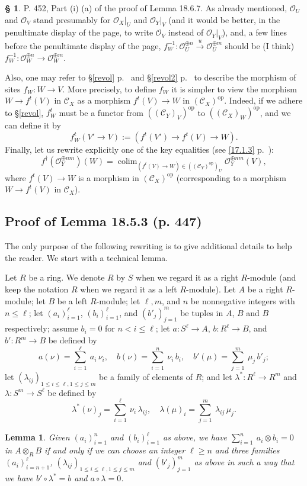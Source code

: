 \documentclass[12pt]{article}
\newtheorem{lem}[thm]{Lemma}
\theoremstyle{remark}
\theoremstyle{definition}
\newtheorem{s}[thm]{\S}
\newcommand{\cc}{\mathcal}
\newcommand{\C}{\mathcal C}
\newcommand{\xr}{\xrightarrow}
\DeclareMathOperator*{\co}{colim}
\DeclareMathOperator{\op}{op}
\begin{document}
%
%
\begin{s} 
P. 452, Part (i) (a) of the proof of Lemma 18.6.7. As already mentioned, $\cc O_U$ and $\cc O_V$ stand presumably for $\cc O_X|_U$ and $\cc O_Y|_V$ (and it would be better, in the penultimate display of the page, to write $\cc O_V$ instead of $\cc O_Y|_V$), and, a few lines before the penultimate display of the page, $f_W^{-1}:\cc O_U^{\oplus n}\xr u\cc O_U^{\oplus m}$ should be (I think) $f_W^{-1}:\cc O_W^{\oplus n}\to\cc O_W^{\oplus m}$. 

Also, one may refer to \S\ref{revol} p.~\pageref{revol} and \S\ref{revol2} p.~\pageref{revol2} to describe the morphism of sites $f_W:W\to V$. More precisely, to define $f_W$ it is simpler to view the morphism $W\to f^t(V)$ in $\C_X$ as a morphism $f^t(V)\to W$ in $(\C_X)^{\op}$. Indeed, if we adhere to \S\ref{revol}, $f_W^t$ must be a functor from $((\C_Y)_V)^{\op}$ to $((\C_X)_W)^{\op}$, and we can define it by 
$$
f_W^t(V'\to V):=(f^t(V')\to f^t(V)\to W).
$$
Finally, let us rewrite explicitly one of the key equalities (see \eqref{17.1.3} p.~\pageref{17.1.3}): 
$$
f^\dagger(\cc O_Y^{\oplus nm})(W)=\co_{(f^t(V)\to W)\in((\C_Y)^{\op})_U}\cc O_Y^{\oplus nm}(V),
$$ 
where $f^t(V)\to W$ is a morphism in $(\C_X)^{\op}$ (corresponding to a morphism $W\to f^t(V)$ in $\C_X$).
\end{s}
%
\subsection{Proof of Lemma 18.5.3 (p. 447)}
%
The only purpose of the following rewriting is to give additional details to help the reader. We start with a technical lemma.

Let $R$ be a ring. We denote $R$ by $S$ when we regard it as a right $R$-module (and keep the notation $R$ when we regard it as a left $R$-module). Let $A$ be a right $R$-module; let $B$ be a left $R$-module; let $\ell,m$, and $n$ be nonnegative integers with $n\le\ell$; let $(a_i)_{i=1}^\ell$, $(b_i)_{i=1}^\ell$, and $(b'_j)_{j=1}^m$ be tuples in $A$, $B$ and $B$ respectively; assume $b_i=0$ for $n<i\le\ell$; let $a:S^\ell\to A$, $b:R^\ell\to B$, and $b':R^m\to B$ be defined by 
$$
a(\nu)=\sum_{i=1}^\ell\ a_i\,\nu_i,\quad b(\nu)=\sum_{i=1}^n\ \nu_i\,b_i,\quad b'(\mu)=\sum_{j=1}^m\ \mu_j\,b'_j;
$$ 
let $(\lambda_{ij})_{1\le i\le\ell,1\le j\le m}$ be a family of elements of $R$; and let $\lambda^*:R^\ell\to R^m$ and $\lambda:S^m\to S^\ell$ be defined by 
$$
\lambda^*(\nu)_j=\sum_{i=1}^\ell\ \nu_i\,\lambda_{ij},\quad
\lambda(\mu)_i=\sum_{j=1}^m\ \lambda_{ij}\,\mu_j.
$$
%
\begin{lem}\label{techlem}
Given $(a_i)_{i=1}^n$ and $(b_i)_{i=1}^\ell$ as above, we have $\sum_{i=1}^n\ a_i\otimes b_i=0$ in $A\otimes_RB$ if and only if we can choose an integer $\ell\ge n$ and three families $(a_i)_{i=n+1}^\ell$, $(\lambda_{ij})_{1\le i\le\ell,1\le j\le m}$ and $(b'_j)_{j=1}^m$ as above in such a way that we have $b'\circ\lambda^*=b$ and $a\circ\lambda=0$.
\end{lem}
%
\end{document}
